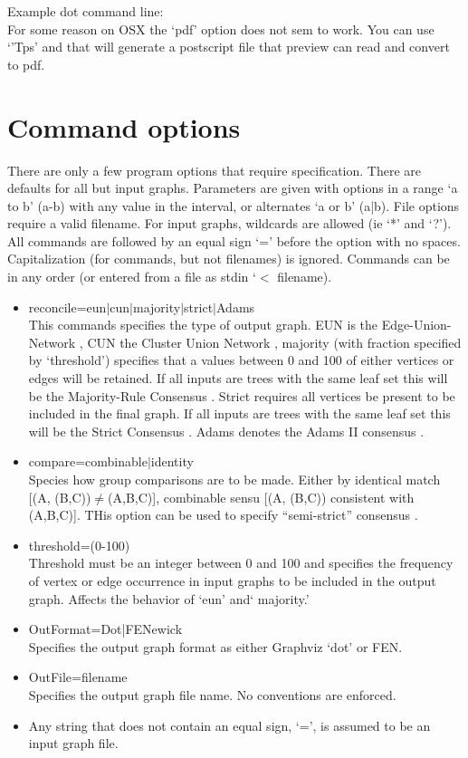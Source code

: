 \documentclass[11pt]{memoir}
\begin{document}
	Example dot command line:
	\\
	
	For some reason on OSX the `pdf' option does not sem to work.  You can use `'Tps' and that will generate a postscript file that preview can read and convert to pdf.
	
	\section{Command options}
	There are only a few program options that require specification.  There are defaults for all but input graphs.  
	Parameters are given with options in a range `a to b' (a-b) with any value in the interval, or alternates `a or b' (a|b). File options require a valid filename.
	For input graphs, wildcards are allowed (ie `*' and `?').  All commands are followed by an equal sign `=' before the option with no spaces.  Capitalization (for commands, but not filenames) is ignored.  Commands can be in any order (or entered from a file as stdin `$<$ filename).
	
	
	\begin{itemize}
		\item {reconcile=eun$\mid$cun$\mid$majority$\mid$strict$\mid$Adams\\This commands specifies the type of output graph.
		EUN is the Edge-Union-Network \cite{MiyagiandWheeler2019}, CUN the Cluster Union Network \citep{Baroni2005},
		majority (with fraction specified by `threshold') specifies that a values between 0 and 100 of either vertices or edges will be retained.  If all inputs are trees with the same leaf set this will be the Majority-Rule Consensus \citep{MargushandMcMorris1981}.
		Strict requires all vertices be present to be included in the final graph.  If all inputs are trees with the same leaf set this will be the Strict Consensus \citep{Schuhandpolhemus1980}. Adams denotes the Adams II consensus \citep{Adams1972}.}
		\item{compare=combinable$\mid$identity\\Species how group comparisons are to be made.  Either by identical match [(A, (B,C))$\neq$(A,B,C)],
			combinable sensu \cite{Nelson1979} [(A, (B,C)) consistent with (A,B,C)].  THis option can be used to specify ``semi-strict'' consensus
			\citep{Bremer1990}.
		}
		\item{threshold=(0-100)\\Threshold must be an integer between 0 and 100 and specifies the frequency of vertex or edge occurrence in input graphs to be included in the output graph.  Affects the behavior of `eun' and` majority.'
		}
		\item{OutFormat=Dot|FENewick\\Specifies the output graph format as either Graphviz `dot' or FEN.
		}
		\item{OutFile=filename\\Specifies the output graph file name. No conventions are enforced.
		}
		\item{Any string that does not contain an equal sign, `=', is assumed to be an input graph file. 
		}
	\end{itemize}
	
\end{document}
